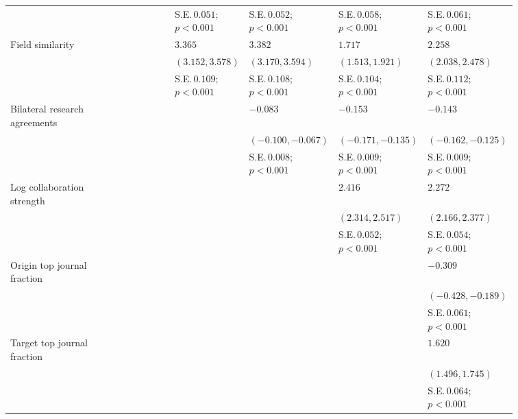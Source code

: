 \begin{table}[H]
{\begin{tabular}{p{0.2\linewidth}p{0.11\linewidth}p{0.11\linewidth}p{0.11\linewidth}p{0.11\linewidth}p{0.11\linewidth}p{0.11\linewidth}}
 &  &  & S.E.\,$0.051$; ${p < 0.001}$ & S.E.\,$0.052$; ${p < 0.001}$ & S.E.\,$0.058$; ${p < 0.001}$ & S.E.\,$0.061$; ${p < 0.001}$\\ [0.8ex]  
Field similarity &  &  & $3.365$ & $3.382$ & $1.717$ & $2.258$\\ 
 &  &  & $(3.152, 3.578)$ & $(3.170, 3.594)$ & $(1.513, 1.921)$ & $(2.038, 2.478)$\\ 
 &  &  & S.E.\,$0.109$; ${p < 0.001}$ & S.E.\,$0.108$; ${p < 0.001}$ & S.E.\,$0.104$; ${p < 0.001}$ & S.E.\,$0.112$; ${p < 0.001}$\\ [0.8ex]  
Bilateral research agreements &  &  &  & $-0.083$ & $-0.153$ & $-0.143$\\ 
 &  &  &  & $(-0.100, -0.067)$ & $(-0.171, -0.135)$ & $(-0.162, -0.125)$\\ 
 &  &  &  & S.E.\,$0.008$; ${p < 0.001}$ & S.E.\,$0.009$; ${p < 0.001}$ & S.E.\,$0.009$; ${p < 0.001}$\\ [0.8ex]  
Log collaboration strength &  &  &  &  & $2.416$ & $2.272$\\ 
 &  &  &  &  & $(2.314, 2.517)$ & $(2.166, 2.377)$\\ 
 &  &  &  &  & S.E.\,$0.052$; ${p < 0.001}$ & S.E.\,$0.054$; ${p < 0.001}$\\ [0.8ex]  
Origin top journal fraction &  &  &  &  &  & $-0.309$\\ 
 &  &  &  &  &  & $(-0.428, -0.189)$\\ 
 &  &  &  &  &  & S.E.\,$0.061$; ${p < 0.001}$\\ [0.8ex]  
Target top journal fraction &  &  &  &  &  & $1.620$\\ 
 &  &  &  &  &  & $(1.496, 1.745)$\\ 
 &  &  &  &  &  & S.E.\,$0.064$; ${p < 0.001}$\\ [0.8ex]  
\hline 
\end{tabular}
}
\end{table}
